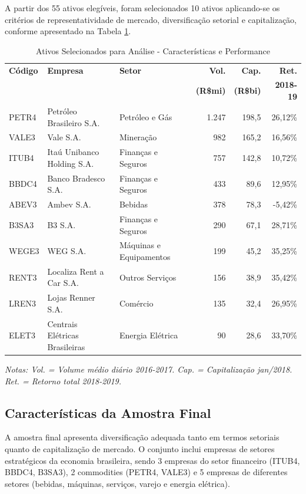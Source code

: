 A partir dos 55 ativos elegíveis, foram selecionados 10 ativos aplicando-se os critérios de representatividade de mercado, diversificação setorial e capitalização, conforme apresentado na Tabela \ref{tab:ativos_selecionados}.

\begin{table}[H]
\centering
\caption{Ativos Selecionados para Análise - Características e Performance}
\scriptsize
\begin{tabular}{|l|p{3.2cm}|p{2.0cm}|r|r|r|}
\hline
\textbf{Código} & \textbf{Empresa} & \textbf{Setor} & \textbf{Vol.} & \textbf{Cap.} & \textbf{Ret.} \\
& & & \textbf{(R\$mi)} & \textbf{(R\$bi)} & \textbf{2018-19} \\
\hline
PETR4 & Petróleo Brasileiro S.A. & Petróleo e Gás & 1.247 & 198,5 & 26,12\% \\
\hline
VALE3 & Vale S.A. & Mineração & 982 & 165,2 & 16,56\% \\
\hline
ITUB4 & Itaú Unibanco Holding S.A. & Finanças e Seguros & 757 & 142,8 & 10,72\% \\
\hline
BBDC4 & Banco Bradesco S.A. & Finanças e Seguros & 433 & 89,6 & 12,95\% \\
\hline
ABEV3 & Ambev S.A. & Bebidas & 378 & 78,3 & -5,42\% \\
\hline
B3SA3 & B3 S.A. & Finanças e Seguros & 290 & 67,1 & 28,71\% \\
\hline
WEGE3 & WEG S.A. & Máquinas e Equipamentos & 199 & 45,2 & 35,25\% \\
\hline
RENT3 & Localiza Rent a Car S.A. & Outros Serviços & 156 & 38,9 & 35,42\% \\
\hline
LREN3 & Lojas Renner S.A. & Comércio & 135 & 32,4 & 26,95\% \\
\hline
ELET3 & Centrais Elétricas Brasileiras & Energia Elétrica & 90 & 28,6 & 33,70\% \\
\hline
\end{tabular}
\normalsize
\textit{Notas: Vol. = Volume médio diário 2016-2017. Cap. = Capitalização jan/2018. Ret. = Retorno total 2018-2019.}
\label{tab:ativos_selecionados}
\end{table}

\subsection{Características da Amostra Final}

A amostra final apresenta diversificação adequada tanto em termos setoriais quanto de capitalização de mercado. O conjunto inclui empresas de setores estratégicos da economia brasileira, sendo 3 empresas do setor financeiro (ITUB4, BBDC4, B3SA3), 2 commodities (PETR4, VALE3) e 5 empresas de diferentes setores (bebidas, máquinas, serviços, varejo e energia elétrica).


